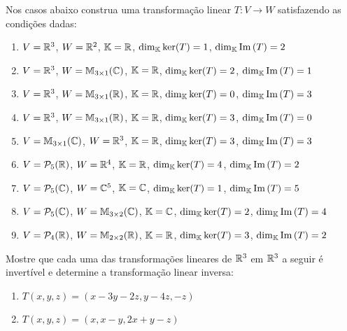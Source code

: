 \documentclass[12pt]{exam}
\begin{document}
\begin{exercicio}
  Nos casos abaixo construa uma transformação linear $T : V \to W$ satisfazendo as condições dadas:
  \begin{enumerate}[label={\alph*})]
    \item $V = \mathbb{R}^3$, $W = \mathbb{R}^2$, $\mathbb{K} = \mathbb{R}$, $\dim_{\mathbb{K}} \ker(T) = 1$, $\dim_{\mathbb{K}} {\rm Im\,}(T) = 2$

    \item $V = \mathbb{R}^3$, $W = \mathbb{M}_{3\times 1}(\mathbb{C})$, $\mathbb{K} = \mathbb{R}$, $\dim_{\mathbb{K}} \ker(T) = 2$, $\dim_{\mathbb{K}} {\rm Im\,}(T) = 1$

    \item $V = \mathbb{R}^3$, $W = \mathbb{M}_{3\times 1}(\mathbb{R})$, $\mathbb{K} = \mathbb{R}$, $\dim_{\mathbb{K}} \ker(T) = 0$, $\dim_{\mathbb{K}} {\rm Im\,}(T) = 3$

    \item $V = \mathbb{R}^3$, $W = \mathbb{M}_{3\times 1}(\mathbb{R})$, $\mathbb{K} = \mathbb{R}$, $\dim_{\mathbb{K}} \ker(T) = 3$, $\dim_{\mathbb{K}} {\rm Im\,}(T) = 0$

    \item $V = \mathbb{M}_{3\times 1}(\mathbb{C})$, $W = \mathbb{R}^3$, $\mathbb{K} = \mathbb{R}$, $\dim_{\mathbb{K}} \ker(T) = 3$, $\dim_{\mathbb{K}} {\rm Im\,}(T) = 3$

    \item $V = \mathcal{P}_5(\mathbb{R})$, $W = \mathbb{R}^4$, $\mathbb{K} = \mathbb{R}$, $\dim_{\mathbb{K}} \ker(T) = 4$, $\dim_{\mathbb{K}} {\rm Im\,}(T) = 2$

    \item $V = \mathcal{P}_5(\mathbb{C})$, $W = \mathbb{C}^5$, $\mathbb{K} = \mathbb{C}$, $\dim_{\mathbb{K}} \ker(T) = 1$, $\dim_{\mathbb{K}} {\rm Im\,}(T) = 5$

    \item $V = \mathcal{P}_5(\mathbb{C})$, $W = \mathbb{M}_{3\times 2}(\mathbb{C})$, $\mathbb{K} = \mathbb{C}$, $\dim_{\mathbb{K}} \ker(T) = 2$, $\dim_{\mathbb{K}} {\rm Im\,}(T) = 4$

    \item $V = \mathcal{P}_4(\mathbb{R})$, $W = \mathbb{M}_{2\times 2}(\mathbb{R})$, $\mathbb{K} = \mathbb{R}$, $\dim_{\mathbb{K}} \ker(T) = 3$, $\dim_{\mathbb{K}} {\rm Im\,}(T) = 2$
  \end{enumerate}
\end{exercicio}

\begin{exercicio}
  Mostre que cada uma das transformações lineares de $\mathbb{R}^3$ em $\mathbb{R}^3$ a seguir é invertível e determine a transformação linear inversa:
  \begin{enumerate}[label={\alph*})]
    \item $T(x,y,z) = (x - 3y - 2z, y - 4z, -z)$

    \item $T(x,y,z) = (x, x - y, 2x + y -z)$
  \end{enumerate}
\end{exercicio}
\end{document}
